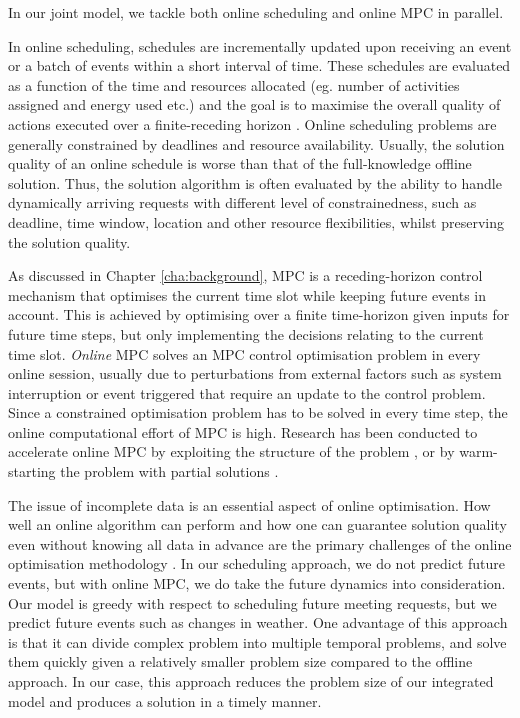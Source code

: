 In our joint model, we tackle both online scheduling and online MPC in parallel. 

In online scheduling, schedules are incrementally updated upon receiving an event or a batch of events within a short interval of time. These schedules are evaluated as a function of the time and resources allocated (eg. number of activities assigned and energy used etc.) and the goal is to maximise the overall quality of actions executed over a finite-receding horizon \citep{gallagher2006incremental}. Online scheduling problems are generally constrained by deadlines and resource availability. Usually, the solution quality of an online schedule is worse than that of the full-knowledge offline solution. Thus, the solution algorithm is often evaluated by the ability to handle dynamically arriving requests with different level of constrainedness, such as deadline, time window, location and other resource flexibilities, whilst preserving the solution quality. 

As discussed in Chapter \ref{cha:background}, MPC is a receding-horizon control mechanism that optimises the current time slot while keeping future events in account. This is achieved by optimising over a finite time-horizon given inputs for future time steps, but only implementing the decisions relating to the current time slot. \textsl{Online} MPC solves an MPC control optimisation problem in every online session, usually due to perturbations from external factors such as system interruption or event triggered that require an update to the control problem. Since a constrained optimisation problem has to be solved in every time step, the online computational effort of MPC is high. Research has been conducted to accelerate online MPC by exploiting the structure of the problem \citep{wang2010fast,lim2016online}, or by warm-starting the problem with partial solutions \citep{jost2013accelerating}.

The issue of incomplete data is an essential aspect of online optimisation. How well an online algorithm can perform and how one can guarantee solution quality even without knowing all data in advance are the primary challenges of the online optimisation methodology \citep{jaillet2012online}. In our scheduling approach, we do not predict future events, but with online MPC, we do take the future dynamics into consideration. Our model is greedy with respect to scheduling future meeting requests, but we predict future events such as changes in weather. One advantage of this approach is that it can divide complex problem into multiple temporal problems, and solve them quickly given a relatively smaller problem size compared to the offline approach. In our case, this approach reduces the problem size of our integrated model and produces a solution in a timely manner.


